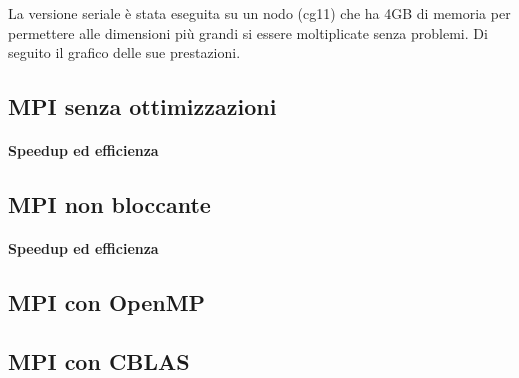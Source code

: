 La versione seriale \`{e} stata eseguita su un nodo (cg11) che ha 4GB di memoria per permettere alle dimensioni pi\`{u} grandi si essere moltiplicate senza problemi. Di seguito il grafico delle sue prestazioni.

\subsection{MPI senza ottimizzazioni}
\paragraph{Speedup ed efficienza}

\subsection{MPI non bloccante}
\paragraph{Speedup ed efficienza}

\subsection{MPI con OpenMP}

\subsection{MPI con CBLAS}
